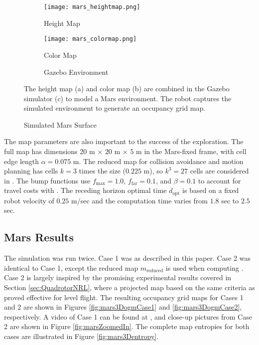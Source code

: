 \begin{figure}[!t]
	\centering
	\begin{subfigure}[t]{0.3\columnwidth}
           	\centering
          	\texttt{[image: mars\_heightmap.png]}
        		\caption{Height Map}
    	\end{subfigure}
    	\begin{subfigure}[t]{0.3\columnwidth}
           	\centering
          	\texttt{[image: mars\_colormap.png]}
        		\caption{Color Map}
    	\end{subfigure}
    	\begin{subfigure}[t]{0.3\columnwidth}
        		\caption{Gazebo Environment}
    	\end{subfigure}
	\caption{Simulated Mars Surface}
	\medskip
	\small
	The height map (a) and color map (b) are combined in the Gazebo simulator (c) to model a Mars environment. The robot captures the simulated environment to generate an occupancy grid map.
	\label{fig:MarsGazebo}
\end{figure}

The map parameters are also important to the success of the exploration. The full map has dimensions $20$ m $\times$ $20$ m $\times$ $5$ m in the Mars-fixed frame, with cell edge length $\alpha=0.075$ m. The reduced map for collision avoidance and motion planning has cells $k=3$ times the size ($0.225$ m), so $k^3=27$ cells are considered in . The bump functions use $f_\text{max}=1.0$, $f_\text{far}=0.1$, and $\beta=0.1$ to account for travel costs with . The receding horizon optimal time $d_\text{opt}$ is based on a fixed robot velocity of $0.25$ m/sec and the computation time varies from $1.8$ sec to $2.5$ sec.

\subsection{Mars Results}

The simulation was run twice. Case 1 was as described in this paper. Case 2 was identical to Case 1, except the reduced map $ m_\text{reduced}$ is used when computing . Case 2 is largely inspired by the promising experimental results covered in Section \ref{sec:QuadrotorNRL}, where a projected map based on the same criteria as  proved effective for level flight. The resulting occupancy grid maps for Cases 1 and 2 are shown in Figures \ref{fig:mars3DogmCase1} and \ref{fig:mars3DogmCase2}, respectively. A video of Case 1 can be found at \href{https://youtu.be/FrBcL2UMW9w}{}, and close-up pictures from Case 2 are shown in Figure \ref{fig:marsZoomedIn}. The complete map entropies for both cases are illustrated in Figure \ref{fig:mars3Dentropy}.


